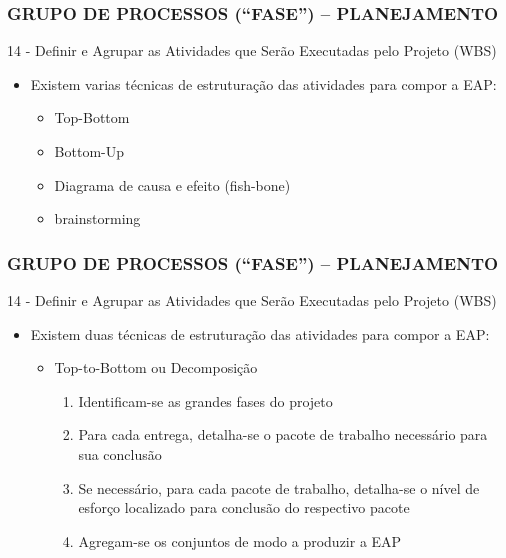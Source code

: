 \begin{frame}
 \frametitle{GRUPO DE PROCESSOS (“FASE”) – PLANEJAMENTO}
   14 - Definir e Agrupar as Atividades que Serão Executadas pelo Projeto (WBS)
  \begin{itemize}
   \item Existem varias técnicas de estruturação das atividades para compor a EAP:
   \begin{itemize}
    \item Top-Bottom
    \item Bottom-Up
    \item Diagrama de causa e efeito (fish-bone)
    \item brainstorming
   \end{itemize}
  \end{itemize}
\end{frame}

\begin{frame}
 \frametitle{GRUPO DE PROCESSOS (“FASE”) – PLANEJAMENTO}
   14 - Definir e Agrupar as Atividades que Serão Executadas pelo Projeto (WBS)
  \begin{itemize}
   \item Existem duas técnicas de estruturação das atividades para compor a EAP:
   \begin{itemize}
    \item Top-to-Bottom ou Decomposição
    \begin{enumerate}
     \item Identificam-se as grandes fases do projeto
     \item Para cada entrega, detalha-se o pacote de trabalho necessário para sua conclusão
     \item Se necessário, para cada pacote de trabalho, detalha-se o nível de esforço localizado para conclusão do respectivo pacote
     \item Agregam-se os conjuntos de modo a produzir a EAP
    \end{enumerate}
   \end{itemize}
  \end{itemize}
\end{frame}

